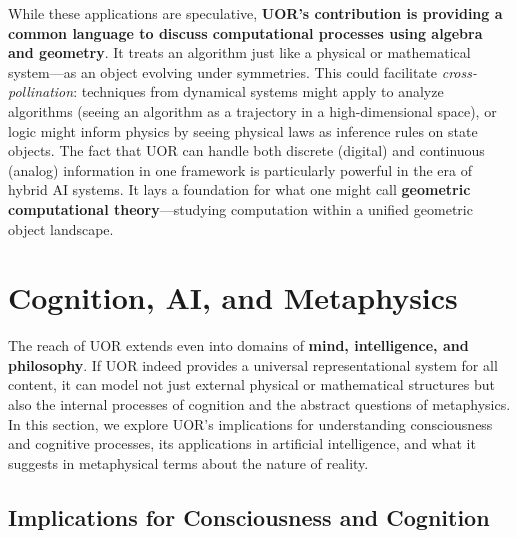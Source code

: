\documentclass[12pt]{article}
\begin{document}
\medskip

While these applications are speculative, \textbf{UOR’s contribution is providing a common language to discuss computational processes using algebra and geometry}. It treats an algorithm just like a physical or mathematical system---as an object evolving under symmetries. This could facilitate \emph{cross-pollination}: techniques from dynamical systems might apply to analyze algorithms (seeing an algorithm as a trajectory in a high-dimensional space), or logic might inform physics by seeing physical laws as inference rules on state objects. The fact that UOR can handle both discrete (digital) and continuous (analog) information in one framework is particularly powerful in the era of hybrid AI systems. It lays a foundation for what one might call \textbf{geometric computational theory}---studying computation within a unified geometric object landscape.

\section{Cognition, AI, and Metaphysics}

The reach of UOR extends even into domains of \textbf{mind, intelligence, and philosophy}. If UOR indeed provides a universal representational system for all content, it can model not just external physical or mathematical structures but also the internal processes of cognition and the abstract questions of metaphysics. In this section, we explore UOR’s implications for understanding consciousness and cognitive processes, its applications in artificial intelligence, and what it suggests in metaphysical terms about the nature of reality.

\subsection{Implications for Consciousness and Cognition}
\end{document}

